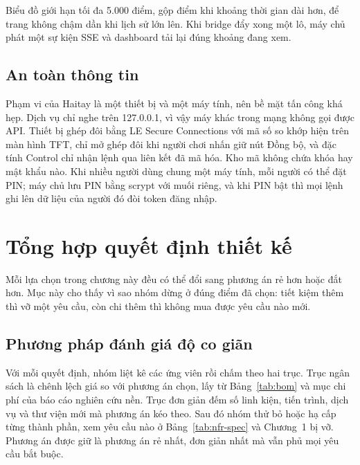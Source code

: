 Biểu đồ giới hạn tối đa 5.000 điểm, gộp điểm khi khoảng thời gian dài hơn, để trang không chậm dần khi lịch sử lớn lên. Khi bridge đẩy xong một lô, máy chủ phát một sự kiện SSE và dashboard tải lại đúng khoảng đang xem.

\subsection{An toàn thông tin}
Phạm vi của Haitay là một thiết bị và một máy tính, nên bề mặt tấn công khá hẹp. Dịch vụ chỉ nghe trên 127.0.0.1, vì vậy máy khác trong mạng không gọi được API. Thiết bị ghép đôi bằng LE Secure Connections với mã số so khớp hiện trên màn hình TFT, chỉ mở ghép đôi khi người chơi nhấn giữ nút Đồng bộ, và đặc tính Control chỉ nhận lệnh qua liên kết đã mã hóa. Kho mã không chứa khóa hay mật khẩu nào. Khi nhiều người dùng chung một máy tính, mỗi người có thể đặt PIN; máy chủ lưu PIN bằng scrypt với muối riêng, và khi PIN bật thì mọi lệnh ghi lên dữ liệu của người đó đòi token đăng nhập.

\section{Tổng hợp quyết định thiết kế}
\label{sec:decisions}
Mỗi lựa chọn trong chương này đều có thể đổi sang phương án rẻ hơn hoặc đắt hơn. Mục này cho thấy vì sao nhóm dừng ở đúng điểm đã chọn: tiết kiệm thêm thì vỡ một yêu cầu, còn chi thêm thì không mua được yêu cầu nào mới.

\subsection{Phương pháp đánh giá độ co giãn}
Với mỗi quyết định, nhóm liệt kê các ứng viên rồi chấm theo hai trục. Trục ngân sách là chênh lệch giá so với phương án chọn, lấy từ Bảng~\ref{tab:bom} và mục chi phí của báo cáo nghiên cứu nền. Trục đơn giản đếm số linh kiện, tiến trình, dịch vụ và thư viện mới mà phương án kéo theo. Sau đó nhóm thử bỏ hoặc hạ cấp từng thành phần, xem yêu cầu nào ở Bảng~\ref{tab:nfr-spec} và Chương~1 bị vỡ. Phương án được giữ là phương án rẻ nhất, đơn giản nhất mà vẫn phủ mọi yêu cầu bắt buộc.

